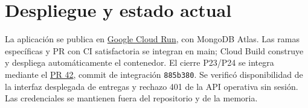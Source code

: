\section{Despliegue y estado actual}
La aplicación se publica en \href{https://procesos26-27-gseerr4ika-no.a.run.app}{Google Cloud Run}, con MongoDB Atlas. Las ramas específicas y PR con CI satisfactoria se integran en main; Cloud Build construye y despliega automáticamente el contenedor. El cierre P23/P24 se integra mediante el \href{https://github.com/Miguel-Requena/Procesos26-27/pull/42}{PR 42}, commit de integración \texttt{885b380}. Se verificó disponibilidad de la interfaz desplegada de entregas y rechazo 401 de la API operativa sin sesión. Las credenciales se mantienen fuera del repositorio y de la memoria.
